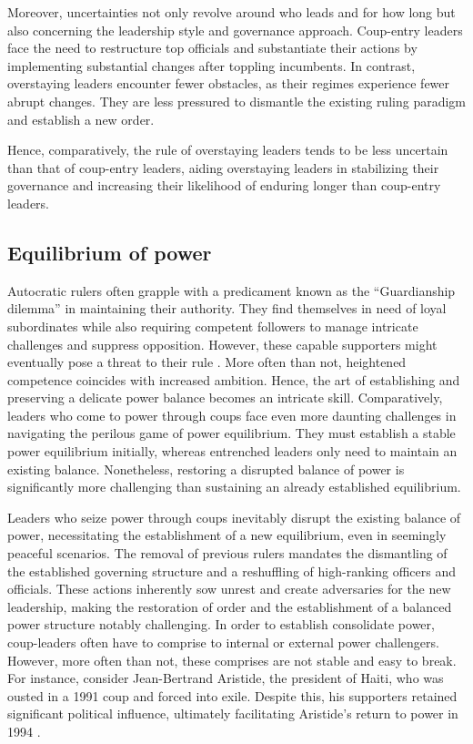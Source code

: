\documentclass[
  12pt,
  a4paper,
  12pt]{article}
\begin{document}
Moreover, uncertainties not only revolve around who leads and for how
long but also concerning the leadership style and governance approach.
Coup-entry leaders face the need to restructure top officials and
substantiate their actions by implementing substantial changes after
toppling incumbents. In contrast, overstaying leaders encounter fewer
obstacles, as their regimes experience fewer abrupt changes. They are
less pressured to dismantle the existing ruling paradigm and establish a
new order.

Hence, comparatively, the rule of overstaying leaders tends to be less
uncertain than that of coup-entry leaders, aiding overstaying leaders in
stabilizing their governance and increasing their likelihood of enduring
longer than coup-entry leaders.

\subsection{Equilibrium of power}\label{equilibrium-of-power}

Autocratic rulers often grapple with a predicament known as the
``Guardianship dilemma'' in maintaining their authority. They find
themselves in need of loyal subordinates while also requiring competent
followers to manage intricate challenges and suppress opposition.
However, these capable supporters might eventually pose a threat to
their rule \citep{wintrobe2012, mcmahon2015, geddes2018}. More often
than not, heightened competence coincides with increased ambition.
Hence, the art of establishing and preserving a delicate power balance
becomes an intricate skill. Comparatively, leaders who come to power
through coups face even more daunting challenges in navigating the
perilous game of power equilibrium. They must establish a stable power
equilibrium initially, whereas entrenched leaders only need to maintain
an existing balance. Nonetheless, restoring a disrupted balance of power
is significantly more challenging than sustaining an already established
equilibrium.

Leaders who seize power through coups inevitably disrupt the existing
balance of power, necessitating the establishment of a new equilibrium,
even in seemingly peaceful scenarios. The removal of previous rulers
mandates the dismantling of the established governing structure and a
reshuffling of high-ranking officers and officials. These actions
inherently sow unrest and create adversaries for the new leadership,
making the restoration of order and the establishment of a balanced
power structure notably challenging. In order to establish consolidate
power, coup-leaders often have to comprise to internal or external power
challengers. However, more often than not, these comprises are not
stable and easy to break. For instance, consider Jean-Bertrand Aristide,
the president of Haiti, who was ousted in a 1991 coup and forced into
exile. Despite this, his supporters retained significant political
influence, ultimately facilitating Aristide's return to power in 1994
\citep{bermeo2016}.
\end{document}
